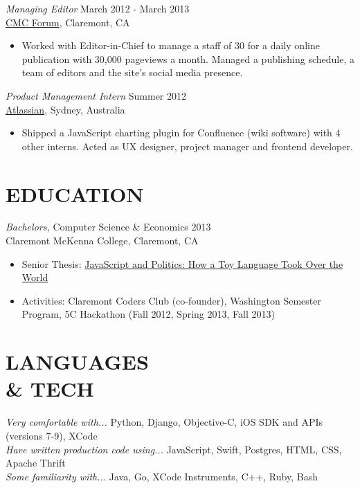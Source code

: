 \documentclass[margin, 10pt]{res}
\begin{document}
\begin{resume}
\begin{flushleft}
{\sl Managing Editor} \hfill March 2012 - March 2013 \\
\href{http://cmcforum.com/}{CMC Forum}, Claremont, CA
\begin{itemize}
\item Worked with Editor-in-Chief to manage a staff of 30 for a daily online publication with 30,000 pageviews a month. Managed a publishing schedule, a team of editors and the site's social media presence.
\end{itemize}

{\sl Product Management Intern} \hfill Summer 2012 \\
\href{https://www.atlassian.com/}{Atlassian}, Sydney, Australia
\begin{itemize}
\item Shipped a JavaScript charting plugin for Confluence (wiki software) with 4 other interns. Acted as UX designer, project manager and frontend developer.
\end{itemize}


\section{EDUCATION}

{\sl Bachelors,} Computer Science \& Economics \hfill 2013 \\
Claremont McKenna College, Claremont, CA
\begin{itemize} \itemsep -1pt %
\item Senior Thesis: \href{http://scholarship.claremont.edu/cmc_theses/758/}{JavaScript and Politics: How a Toy Language Took Over the World}
\item Activities: Claremont Coders Club (co-founder), Washington Semester Program, 5C Hackathon (Fall 2012, Spring 2013, Fall 2013)
\end{itemize}


\section{LANGUAGES \\ \& TECH }
{\sl Very comfortable with...} Python, Django, Objective-C, iOS SDK and APIs (versions 7-9), XCode \\
{\sl Have written production code using...} JavaScript, Swift, Postgres, HTML, CSS, Apache Thrift \\
{\sl Some familiarity with...} Java, Go, XCode Instruments, C++, Ruby, Bash


\end{flushleft}
\end{resume}
\end{document}
